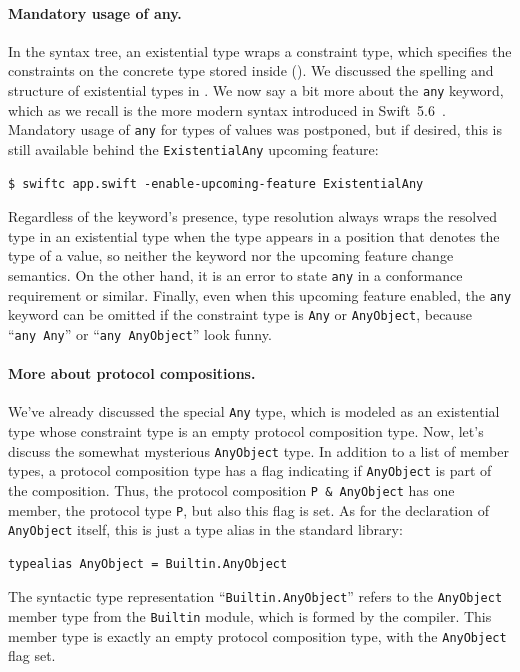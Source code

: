 \documentclass[../generics]{subfiles}
\begin{document}
\paragraph{Mandatory usage of any.}
In the syntax tree, an existential type wraps a constraint type, which specifies the constraints on the concrete type stored inside (). We discussed the spelling and structure of existential types in . We now say a bit more about the \texttt{any} keyword, which as we recall is the more modern syntax introduced in Swift~5.6~\cite{se0335}. Mandatory usage of \texttt{any} for types of values was postponed, but if desired, this is still available behind the \texttt{ExistentialAny} upcoming feature:
\begin{Verbatim}
$ swiftc app.swift -enable-upcoming-feature ExistentialAny
\end{Verbatim}
Regardless of the keyword's presence, type resolution always wraps the resolved type in an existential type when the type appears in a position that denotes the type of a value, so neither the keyword nor the upcoming feature change semantics. On the other hand, it is an error to state \texttt{any} in a conformance requirement or similar. Finally, even when this upcoming feature enabled, the \texttt{any} keyword can be omitted if the constraint type is \texttt{Any} or \texttt{AnyObject}, because ``\texttt{any~Any}'' or ``\texttt{any~AnyObject}'' look funny.

\paragraph{More about protocol compositions.}
We've already discussed the special \texttt{Any} type, which is modeled as an existential type whose constraint type is an empty protocol composition type. Now, let's discuss the somewhat mysterious \texttt{AnyObject} type. In addition to a list of member types, a protocol composition type has a flag indicating if \texttt{AnyObject} is part of the composition. Thus, the protocol composition \texttt{P \& AnyObject} has one member, the protocol type \texttt{P}, but also this flag is set. As for the declaration of \texttt{AnyObject} itself, this is just a type alias in the standard library:
\begin{Verbatim}
typealias AnyObject = Builtin.AnyObject
\end{Verbatim}
The syntactic type representation ``\texttt{Builtin.AnyObject}'' refers to the \texttt{AnyObject} member type from the \texttt{Builtin} module, which is formed by the compiler. This member type is exactly an empty protocol composition type, with the \texttt{AnyObject} flag set.
\end{document}
